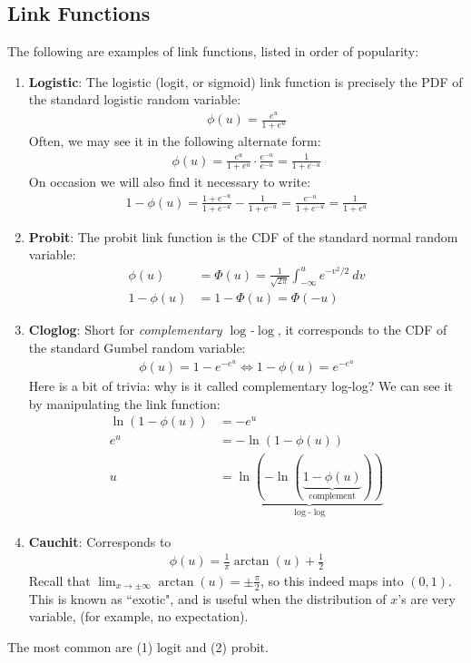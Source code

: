 \documentclass[12pt, a4paper]{article}
\theoremstyle{definition}
\begin{document}
	\subsection*{Link Functions}
	The following are examples of link functions, listed in order of popularity:
	\begin{enumerate}[label=(\arabic*)]
		\item \textbf{Logistic}: The logistic (logit, or sigmoid) link function is precisely the
		PDF of the standard logistic random variable:
		\begin{align*}
			\phi(u) = \frac{e^u}{1 + e^u}
		\end{align*}
		Often, we may see it in the following alternate form:
		\begin{align*}
			\phi(u) = \frac{e^u}{1 + e^u}\cdot \frac{e^{-u}}{e^{-u}} = \frac{1}{1 + e^{-u}}
		\end{align*}
		On occasion we will also find it necessary to write:
		\begin{align*}
			1-\phi(u)
			= \frac{1 + e^{-u}}{1 + e^{-u}} - \frac{1}{1 + e^{-u}}
			= \frac{e^{-u}}{1 + e^{-u}}
			=\frac{1}{1 + e^{u}}
		\end{align*}
		\item \textbf{Probit}: The probit link function is the CDF of the standard
		normal random variable:
		\begin{align*}
			\phi(u) &= \Phi(u) = \frac{1}{\sqrt{2\pi}} \int_{-\infty}^{u}e^{-v^2/2}\ dv\\
			1-\phi(u) &= 1-\Phi(u)=\Phi(-u)
		\end{align*}
		\item \textbf{Cloglog}: Short for \textit{complementary $\log$-$\log$}, it corresponds to
		the CDF of the standard Gumbel random variable:
		\begin{align*}
			\phi(u) = 1 - e^{-e^u}\iff 1-\phi(u) = e^{-e^u}
		\end{align*}
		Here is a bit of trivia: why is it called complementary log-log? We can see it
		by manipulating the link function:
		\begin{align*}
			\ln(1-\phi(u)) &= -e^u \\
			e^u &= -\ln(1-\phi(u))\\
			u&=\underbrace{\ln(-\ln(\underbrace{1-\phi(u)}_{\text{complement}}))}_{\log\text{-}\log}
		\end{align*}
		\item \textbf{Cauchit}: Corresponds to
		\begin{align*}
			\phi(u) = \frac{1}{\pi} \arctan(u) + \frac{1}{2}
		\end{align*}
		Recall that $\lim_{x\to\pm \infty}\arctan(u) = \pm \frac{\pi}{2}$, so
		this indeed maps into $(0, 1)$. This is known as ``exotic", and is useful when
		the distribution of $x$'s are very variable, (for example, no expectation).
	\end{enumerate}
	The most common are (1) logit and (2) probit.
\end{document}
